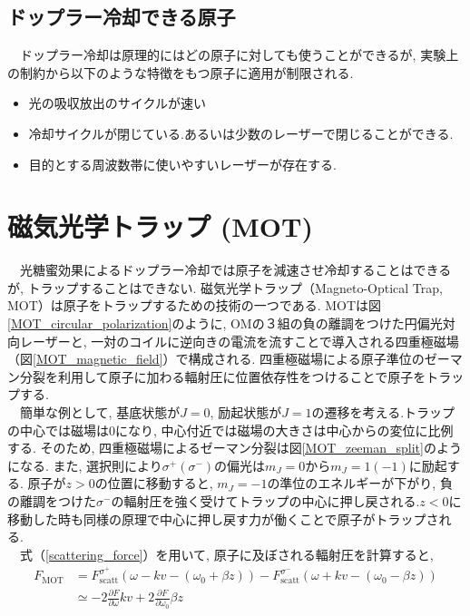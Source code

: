 \documentclass[uplatex, dvipdfmx, a4paper, report, papersize, 11pt]{jsbook}
\begin{document}
\subsection{ドップラー冷却できる原子}
　ドップラー冷却は原理的にはどの原子に対しても使うことができるが, 実験上の制約から以下のような特徴をもつ原子に適用が制限される\cite{ノーベル賞と分光学}.
\begin{itemize}
  \item 光の吸収放出のサイクルが速い
  \item 冷却サイクルが閉じている.あるいは少数のレーザーで閉じることができる.
  \item 目的とする周波数帯に使いやすいレーザーが存在する.
\end{itemize}

\newpage


\section{磁気光学トラップ (MOT)}
　光糖蜜効果によるドップラー冷却では原子を減速させ冷却することはできるが, トラップすることはできない. 磁気光学トラップ（Magneto-Optical Trap,  MOT）は原子をトラップするための技術の一つである. MOTは図\ref{MOT_circular_polarization}のように, OMの３組の負の離調をつけた円偏光対向レーザーと, 一対のコイルに逆向きの電流を流すことで導入される四重極磁場（図\ref{MOT_magnetic_field}）で構成される. 四重極磁場による原子準位のゼーマン分裂を利用して原子に加わる輻射圧に位置依存性をつけることで原子をトラップする.\\
　簡単な例として, 基底状態が$J = 0$, 励起状態が$J = 1$の遷移を考える.トラップの中心では磁場は$0$になり, 中心付近では磁場の大きさは中心からの変位に比例する. そのため, 四重極磁場によるゼーマン分裂は図\ref{MOT_zeeman_split}のようになる. また, 選択則により$\sigma^{+}(\sigma^{-})$の偏光は$m_J = 0$から$m_J = 1 (-1)$に励起する. 原子が$z > 0$の位置に移動すると, $m_J = -1$の準位のエネルギーが下がり, 負の離調をつけた$\sigma^-$の輻射圧を強く受けてトラップの中心に押し戻される.$z < 0$に移動した時も同様の原理で中心に押し戻す力が働くことで原子がトラップされる.\\
 　式（\ref{scattering_force}）を用いて, 原子に及ぼされる輻射圧を計算すると,
\begin{equation}
  \begin{aligned}
     F _ { \mathrm { MOT } } & = F _ { \mathrm { scatt } } ^ { \sigma ^ { + } } \left( \omega - k v - \left( \omega _ { 0 } + \beta z \right) \right) - F _ { \mathrm { scatt } } ^ { \sigma ^ { - } } \left( \omega + k v - \left( \omega _ { 0 } - \beta z \right) \right) \\ & \simeq - 2 \frac { \partial F } { \partial \omega } k v + 2 \frac { \partial F } { \partial \omega _ { 0 } } \beta z
  \end{aligned}
\end{equation}
\end{document}
